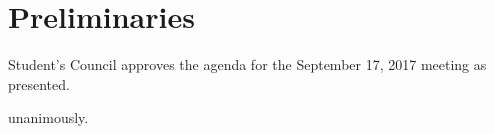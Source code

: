 \section*{Preliminaries}

\begin{information}
\end{information}

\begin{motion}
    \birt Student's Council approves the agenda for the 
     September 17, 2017 meeting as presented. 
    \movers{\brian}{\jill}

    \carries unanimously.
\end{motion}


